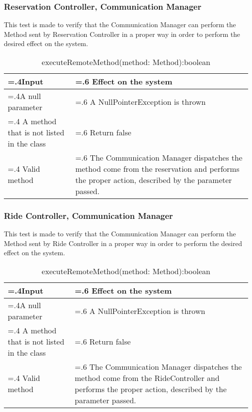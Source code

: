 \documentclass[10pt, a4paper,titlepage]{article}
\begin{document}
\subsubsection{Reservation Controller, Communication Manager}
This test is made to verify that the Communication Manager can perform the Method sent by Reservation Controller in a proper way in order to perform the desired effect on the system.
\begin{table}[h]
\caption{executeRemoteMethod(method: Method):boolean}
\begin{tabularx}{\textwidth}{|>{\hsize=.4\hsize}X|>{\hsize=.6\hsize}X|}
\hline
Input & Effect on the system\\
\hline
A null parameter & A NullPointerException is thrown\\ 
\hline
A method that is not listed in the class & Return false\\
\hline
Valid method & The Communication Manager dispatches the method come from the reservation and performs the proper action, described by the parameter passed. \\
\hline
\end{tabularx}
\end{table}
\pagebreak
\subsubsection{Ride Controller, Communication Manager}
This test is made to verify that the Communication Manager can perform the Method sent by Ride Controller in a proper way in order to perform the desired effect on the system.
\begin{table}[h]
\caption{executeRemoteMethod(method: Method):boolean}
\begin{tabularx}{\textwidth}{|>{\hsize=.4\hsize}X|>{\hsize=.6\hsize}X|}
\hline
Input & Effect on the system\\
\hline
A null parameter & A NullPointerException is thrown\\ 
\hline
A method that is not listed in the class & Return false\\
\hline
Valid method & The Communication Manager dispatches the method come from the RideController and performs the proper action, described by the parameter passed.  \\
\hline
\end{tabularx}
\end{table}
\end{document}
